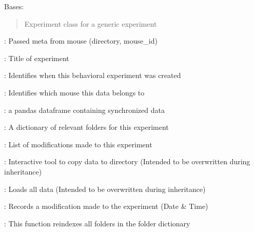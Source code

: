 \documentclass[letterpaper,10pt,english]{sphinxmanual}
\begin{document}
\begin{fulllineitems}
\label{\detokenize{Organization:Organization.Experiment}}
\pysigstartsignatures
{}
\pysigstopsignatures
\sphinxAtStartPar
Bases: 
\begin{quote}

\sphinxAtStartPar
Experiment class for a generic experiment
\end{quote}
\begin{description}
\begin{DUlineblock}{0em}
\item[]  : Passed meta from mouse (directory, mouse\_id)
\item[]  : Title of experiment
\end{DUlineblock}

\begin{DUlineblock}{0em}
\item[]  : Identifies when this behavioral experiment was created
\item[]  : Identifies which mouse this data belongs to
\end{DUlineblock}

\begin{DUlineblock}{0em}
\item[]  : a pandas dataframe containing synchronized data
\item[]  : A dictionary of relevant folders for this experiment
\item[]  : List of modifications made to this experiment
\end{DUlineblock}

\begin{DUlineblock}{0em}
\item[]  : Interactive tool to copy data to directory (Intended to be overwritten during inheritance)
\item[]  : Loads all data (Intended to be overwritten during inheritance)
\item[]  :  Records a modification made to the experiment (Date \& Time)
\item[]  : This function re\sphinxhyphen{}indexes all folders in the folder dictionary
\end{DUlineblock}


\end{description}
\end{fulllineitems}
\end{document}
